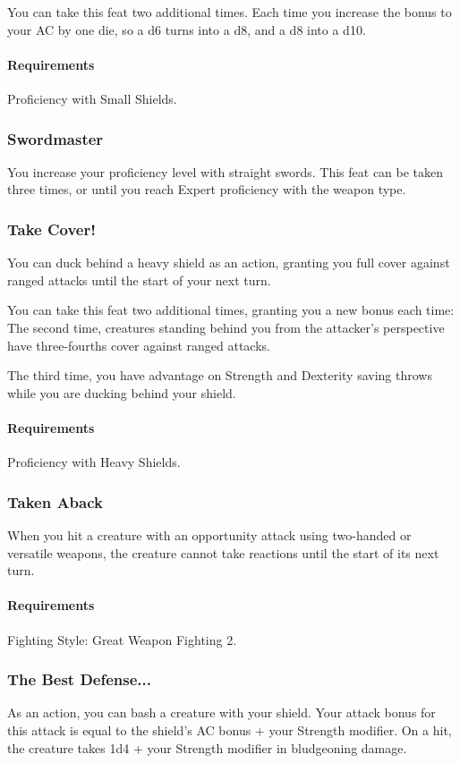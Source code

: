     You can take this feat two additional times.
    Each time you increase the bonus to your AC by one die, so a d6 turns into a d8, and a d8 into a d10.
    \paragraph{Requirements} Proficiency with Small Shields.
\subsubsection{Swordmaster} \label{feat::swordmaster}
    You increase your proficiency level with straight swords.
    This feat can be taken three times, or until you reach Expert proficiency with the weapon type.
\subsubsection{Take Cover!} \label{feat::takecover}
    You can duck behind a heavy shield as an action, granting you full cover against ranged attacks until the start of your next turn.

    You can take this feat two additional times, granting you a new bonus each time:
    The second time, creatures standing behind you from the attacker's perspective have three-fourths cover against ranged attacks.

    The third time, you have advantage on Strength and Dexterity saving throws while you are ducking behind your shield.
    \paragraph{Requirements} Proficiency with Heavy Shields.
\subsubsection{Taken Aback} \label{feat::takenaback}
    When you hit a creature with an opportunity attack using two-handed or versatile weapons, the creature cannot take reactions until the start of its next turn.
    \paragraph{Requirements} Fighting Style: Great Weapon Fighting 2.
\subsubsection{The Best Defense...} \label{feat::thebestdefense}
    As an action, you can bash a creature with your shield.
    Your attack bonus for this attack is equal to the shield's AC bonus + your Strength modifier.
    On a hit, the creature takes 1d4 + your Strength modifier in bludgeoning damage.

